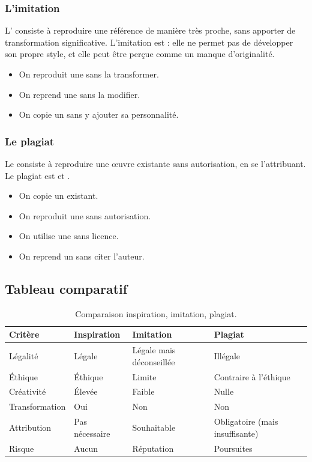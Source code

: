 \subsubsection{L'imitation}

L' consiste à reproduire une référence de manière très proche, sans apporter de transformation significative. L'imitation est  : elle ne permet pas de développer son propre style, et elle peut être perçue comme un manque d'originalité.

\begin{itemize}
    \item On reproduit une  sans la transformer.
    \item On reprend une  sans la modifier.
    \item On copie un  sans y ajouter sa personnalité.
\end{itemize}

\subsubsection{Le plagiat}

Le  consiste à reproduire une œuvre existante sans autorisation, en se l'attribuant. Le plagiat est  et .

\begin{itemize}
    \item On copie un  existant.
    \item On reproduit une  sans autorisation.
    \item On utilise une  sans licence.
    \item On reprend un  sans citer l'auteur.
\end{itemize}

\subsection{Tableau comparatif}

\begin{table}[h!]
\centering
\begin{tabular}{@{}p{2.5cm}p{3.5cm}p{3.5cm}p{3.5cm}@{}}
\toprule
\textbf{Critère} & \textbf{Inspiration} & \textbf{Imitation} & \textbf{Plagiat} \\
\midrule
Légalité & Légale & Légale mais déconseillée & Illégale \\
Éthique & Éthique & Limite & Contraire à l'éthique \\
Créativité & Élevée & Faible & Nulle \\
Transformation & Oui & Non & Non \\
Attribution & Pas nécessaire & Souhaitable & Obligatoire (mais insuffisante) \\
Risque & Aucun & Réputation & Poursuites \\
\bottomrule
\end{tabular}
\caption{Comparaison inspiration, imitation, plagiat.}
\end{table}

